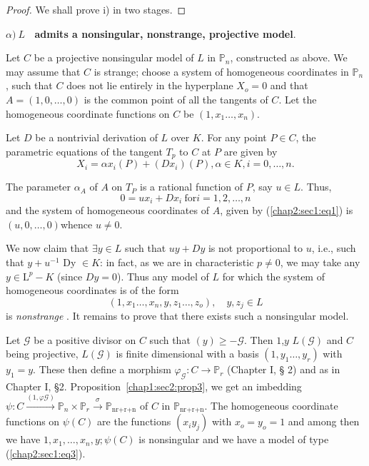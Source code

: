 \begin{proof}%
  We shall prove i) in two stages.
\end{proof}

\medskip
\noindent
{\bf {\boldmath $\alpha)~ L$} ~admits a nonsingular, nonstrange, projective model}.

\medskip
Let $C$ be a projective nonsingular model of $L$ in $\mathbb{P}_n$,
constructed as above. We may assume that $C$ is strange; choose a
system of homogeneous coordinates in $\mathbb{P}_n$, such that $C$
does not lie entirely in the hyperplane $X_o = 0$ and that $A =
(1,0,\ldots,0)$ is the common point of all the tangents of $C$. Let
the homogeneous coordinate functions on $C$ be $(1, x_1\ldots, x_n)$. 

Let $D$ be a nontrivial derivation of $L$ over $K$. For any point $P
\in C$, the parametric equations of the tangent $T_p $ to $C$ at $P$
are given by 
\begin{equation*}
X_i = \alpha x_i(P) + (Dx_i)(P), \alpha \in K, i = 0,\ldots, n.\tag{1}\label{chap2:sec1:eq1}
\end{equation*}

  The parameter ${\alpha_A}$ of $A$ on $T_{P}$ is a rational function of
  $P$, say $u\in L$. Thus, 
\begin{equation*}
  0 = ux{_i} + Dx{_i}  ~\text{for} i = 1,2,\ldots,n\tag{2}\label{chap2:sec1:eq2}
\end{equation*}
  and the system of homogeneous coordinates of $A$, given
  by (\ref{chap2:sec1:eq1})
  is\break 
  $(u,0,\ldots,0)$\pageoriginale whence $u\neq 0$. 

  We now claim that $\exists y \in L$ such that $uy + Dy$ is not
  proportional to $u$, i.e., such that $y + u^{-1}$ Dy $\in K$: in
  fact, as we are in characteristic $p \neq 0$, we may take any $y\in
  \text{L}^p-K$ (since $Dy =0$). Thus any model of $L$ for which the
  system of homogeneous coordinates is of the form  
\begin{equation*}
  (1,x_1\ldots,x_n,y,z_1\ldots,z_o),\quad  y,z_j \in
  L\tag{3}\label{chap2:sec1:eq3}
\end{equation*}
  is \textit{ nonstrange }. It remains to prove that there exists such
  a nonsingular model. 

Let $\mathcal{G}$ be a positive divisor on $C$ such that $(y)\geq -
\mathcal{G}$. Then $1$,$y$ $L(\mathcal{G})$ and $C$ being projective,
$L(\mathcal{G})$ is finite dimensional with a basis
$(1,y_1\ldots,y_r)$ with $y_1=y$. These then define a morphism
$\varphi_{\mathcal{G}}: C \rightarrow\mathbb{P}_r$ (Chapter I, \S
2) and as in Chapter I, \S 2. Proposition~\ref{chap1:sec2:prop3}, we get an
imbedding $\psi: C \xrightarrow{(1,\varphi\mathcal{G})} \mathbb{P}_n
\times \mathbb{P}_r \xrightarrow{\sigma}\mathbb{P}_{\text{nr+r+n}}$ of
$C$ in $\mathbb{P}_{\text{nr+r+n}}$. The homogeneous coordinate
functions on $\psi (C)$ are the functions $(x_i y_j)$ with $x_o = y_o
= 1$ and among then we have $1,x_1,\ldots,x_n, y;\psi(C)$ is
nonsingular and we have a model of type (\ref{chap2:sec1:eq3}). 

